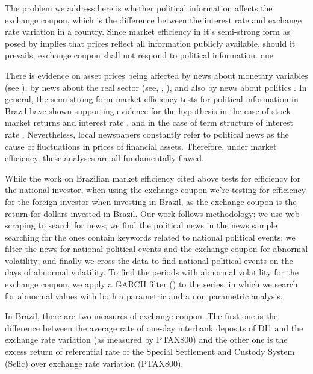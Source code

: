 \documentclass[cic,tc, english]{iiufrgs}
\begin{document}
    The problem we address here is whether political information affects the exchange coupon, which is the difference between the interest rate and exchange rate variation in a country. Since market efficiency in it's semi-strong form as posed by  \citet{fama1970} implies that prices reflect all information publicly available, should it prevails, exchange coupon shall not respond to political information. {que}
  
    There is evidence on asset prices being affected by news about monetary variables (see \citet{cornell1983}), by news about the real sector (see, \citet{mcqueenroley1993}, \citet{caporaleetal2015}), and also by news about politics \citet{marquessantos2016}. In general, the semi-strong form market efficiency tests for political information in Brazil have shown supporting evidence for the hypothesis in the case of stock market returns and interest rate \citet{marquessantos2016}, and in the case of term structure of interest rate \citet{santos2018}. Nevertheless, local newspapers constantly refer to political news as the cause of fluctuations in prices of financial assets. Therefore, under market efficiency, these analyses are all fundamentally flawed.
  
    While the work on Brazilian market efficiency cited above tests for efficiency for the national investor, when using the exchange coupon we're testing for efficiency for the foreign investor when investing in Brazil, as the exchange coupon is the return for dollars invested in Brazil. Our work follows \citet{marquessantos2016} methodology: we use web-scraping to search for news; we find the political news in the news sample searching for the ones contain keywords related to national political events; we filter the news for national political events and the exchange coupon for abnormal volatility; and finally we cross the data to find national political events on the days of abnormal volatility. To find the periods with abnormal volatility for the exchange coupon, we apply a GARCH filter (\citet{bollerslev1986}) to the series, in which we search for abnormal values with both a parametric and a non parametric analysis.

    In Brazil, there are two measures of exchange coupon. The first one is the difference between the average rate of one-day interbank deposits of DI1 and the exchange rate variation (as measured by PTAX800) and the other one is the excess return of referential rate of the Special Settlement and Custody System (Selic) over exchange rate variation (PTAX800). 
  
\end{document}
